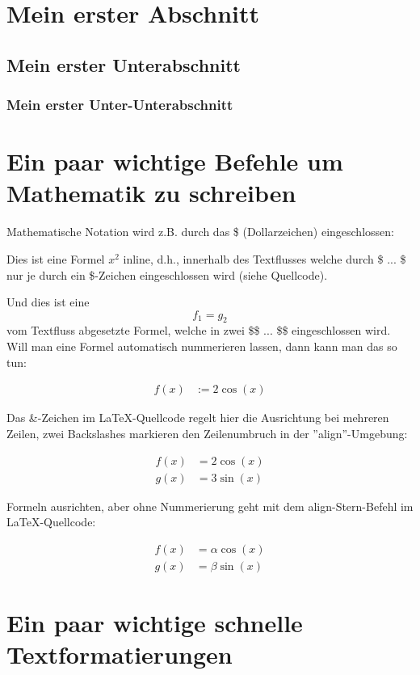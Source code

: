 \section{Mein erster Abschnitt}

\subsection{Mein erster Unterabschnitt}

\subsubsection{Mein erster Unter-Unterabschnitt}

\section{Ein paar wichtige Befehle um Mathematik zu schreiben}

Mathematische Notation wird z.B. durch das \$ (Dollarzeichen) eingeschlossen: 

Dies ist eine Formel $x^2$ inline, d.h., innerhalb des Textflusses welche durch \$ ... \$ nur je durch ein \$-Zeichen eingeschlossen wird (siehe Quellcode).

Und dies ist eine $$f_1 = g_2$$ vom Textfluss abgesetzte Formel, welche in zwei \$\$ ... \$\$ eingeschlossen wird. Will man eine Formel automatisch nummerieren lassen, dann kann man das so tun:

\begin{align}
	f(x) &:= 2 \cos(x) 
\end{align}

Das \&-Zeichen im LaTeX-Quellcode regelt hier die Ausrichtung bei mehreren Zeilen, zwei Backslashes markieren den Zeilenumbruch in der ''align''-Umgebung:

\begin{align}
	f(x) &= 2 \cos(x) \\
	g(x) &= 3 \sin(x)
\end{align}		

Formeln ausrichten, aber ohne Nummerierung geht mit dem align-Stern-Befehl im LaTeX-Quellcode:

\begin{align*}
	f(x) &= \alpha \cos(x) \\
	g(x) &= \beta \sin(x)
\end{align*}		

\section{Ein paar wichtige schnelle Textformatierungen}


